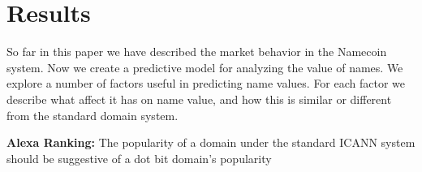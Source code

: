 \section{Results}
\label{sec:results}

So far in this paper we have described the market behavior in the Namecoin system. Now we create a predictive model for analyzing the value of names. We explore a number of factors useful in predicting name values. For each factor we describe what affect it has on name value, and how this is similar or different from the standard domain system.

\textbf{Alexa Ranking:} The popularity of a domain under the standard ICANN system should be suggestive of a dot bit domain's popularity